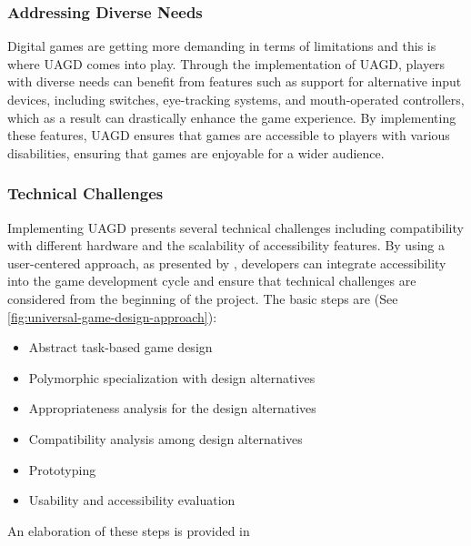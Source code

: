 \documentclass[sigconf,natbib=false,10pt]{acmart}
\begin{document}
	\subsubsection{Addressing Diverse Needs}
	Digital games are getting more demanding in terms of limitations and this is where UAGD comes into play.
	Through the implementation of UAGD, players with diverse needs can benefit from features such as support for alternative input devices, including switches, eye-tracking systems, and mouth-operated controllers, which as a result can drastically enhance the game experience.
	By implementing these features, UAGD ensures that games are accessible to players with various disabilities, ensuring that games are enjoyable for a wider audience.
	
	\subsubsection{Technical Challenges}
	Implementing UAGD presents several technical challenges including compatibility with different hardware and the scalability of accessibility features.
	By using a user-centered approach, as presented by \textcite{grammenos_unified_2007}, developers can integrate accessibility into the game development cycle and ensure that technical challenges are considered from the beginning of the project.
	The basic steps are (See \autoref{fig:universal-game-design-approach}):
	
	\begin{itemize}
		\setlength\itemsep{0.5em}
		\item Abstract task-based game design
		\item Polymorphic specialization with design alternatives
		\item Appropriateness analysis for the design alternatives
		\item Compatibility analysis among design alternatives
		\item Prototyping
		\item Usability and accessibility evaluation
	\end{itemize}
	
	An elaboration of these steps is provided in \textcite{grammenos_unified_2007}
	
\end{document}
